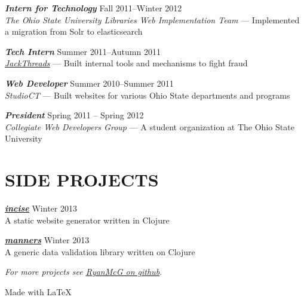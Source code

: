 \documentclass[line,letterpaper]{resume}
\begin{document}
\begin{resume}
    {\sl\textbf{Intern for Technology}} \hfill Fall 2011--Winter 2012\\
    \emph{The Ohio State University Libraries Web Implementation Team} --- Implemented a migration from Solr to elasticsearch
    \vspace{-6pt}

    {\sl\textbf{Tech Intern}} \hfill Summer 2011--Autumn 2011\\
    \emph{\underline{\href{http://www.jackthreads.com/}{JackThreads}}}
    --- Built internal tools and mechanisms to fight fraud
    \vspace{-6pt}

    {\sl\textbf{Web Developer}} \hfill Summer 2010--Summer 2011\\
    \emph{StudioCT} --- Built websites for various Ohio State departments and programs
    \vspace{-6pt}

    {\sl\textbf{President}} \hfill Spring 2011 -- Spring 2012\\
    \emph{Collegiate Web Developers Group} --- A student organization at The
    Ohio State University
    \vspace{-6pt}

    \section{\uppercase{Side Projects}}

    {\sl\textbf{\underline{\href{https://www.ryanmcg.com/incise}{incise}}}}
    \hfill Winter 2013\\
    A static website generator written in Clojure
    \vspace{-6pt}

    {\sl\textbf{\underline{\href{https://www.ryanmcg.com/manners}{manners}}}}
    \hfill Winter 2013\\
    A generic data validation library written on Clojure
    \vspace{-3pt}

    \hfill \emph{For more projects see
    \underline{\href{https://github.com/RyanMcG}{RyanMcG on github}}}.

    \vspace{-15pt}

\end{resume}

\vspace{50pt}

\hfill Made with \LaTeX{}
\end{document}
